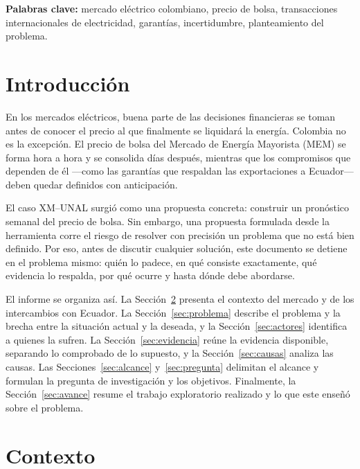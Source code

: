 \documentclass[11pt,letterpaper]{article}
\begin{document}
\medskip
\noindent\textbf{Palabras clave:} mercado eléctrico colombiano, precio de
bolsa, transacciones internacionales de electricidad, garantías,
incertidumbre, planteamiento del problema.

\newpage
{}

\section{Introducción}

En los mercados eléctricos, buena parte de las decisiones financieras se
toman antes de conocer el precio al que finalmente se liquidará la
energía. Colombia no es la excepción. El precio de bolsa del Mercado de
Energía Mayorista (MEM) se forma hora a hora y se consolida días
después, mientras que los compromisos que dependen de él ---como las
garantías que respaldan las exportaciones a Ecuador--- deben quedar
definidos con anticipación.

El caso XM--UNAL surgió como una propuesta concreta: construir un
pronóstico semanal del precio de bolsa. Sin embargo, una propuesta
formulada desde la herramienta corre el riesgo de resolver con precisión
un problema que no está bien definido. Por eso, antes de discutir
cualquier solución, este documento se detiene en el problema mismo:
quién lo padece, en qué consiste exactamente, qué evidencia lo respalda,
por qué ocurre y hasta dónde debe abordarse.

El informe se organiza así. La Sección~\ref{sec:contexto} presenta el
contexto del mercado y de los intercambios con Ecuador. La
Sección~\ref{sec:problema} describe el problema y la brecha entre la
situación actual y la deseada, y la Sección~\ref{sec:actores} identifica
a quienes la sufren. La Sección~\ref{sec:evidencia} reúne la evidencia
disponible, separando lo comprobado de lo supuesto, y la
Sección~\ref{sec:causas} analiza las causas. Las
Secciones~\ref{sec:alcance} y~\ref{sec:pregunta} delimitan el alcance y
formulan la pregunta de investigación y los objetivos. Finalmente, la
Sección~\ref{sec:avance} resume el trabajo exploratorio realizado y lo
que este enseñó sobre el problema.

\section{Contexto}
\label{sec:contexto}
\end{document}
